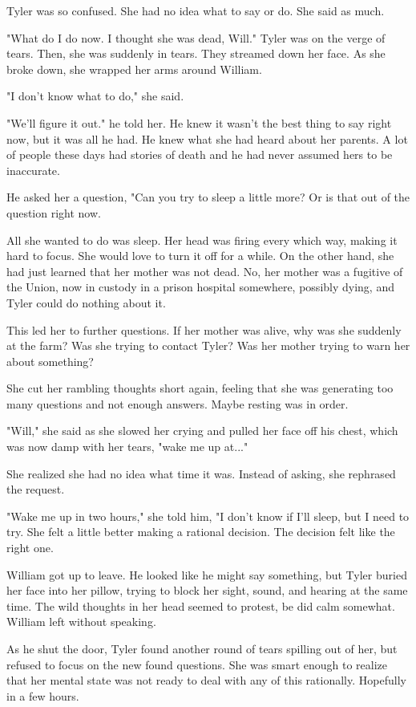 \documentclass[courier]{sffms}
\begin{document}
Tyler was so confused. She had no idea what to
say or do. She said as much.

"What do I do now. I thought she was dead, Will."
Tyler was on the verge of tears. Then, she was
suddenly in tears. They streamed down her face.
As she broke down, she wrapped her arms around
William.

"I don't know what to do," she said.

"We'll figure it out." he told her. He knew it wasn't
the best thing to say right now, but it was all he
had. He knew what she had heard about her
parents. A lot of people these days had stories
of death and he had never assumed hers to be
inaccurate.

He asked her a question, "Can you try to sleep a
little more? Or is that out of the question right
now.

All she wanted to do was sleep. Her head was
firing every which way, making it hard to
focus. She would love to turn it off for a while.
On the other hand, she had just learned that
her mother was not dead. No, her mother was
a fugitive of the Union, now in custody in a
prison hospital somewhere, possibly dying, and
Tyler could do nothing about it.

This led her to further questions. If her mother
was alive, why was she suddenly at the farm?
Was she trying to contact Tyler? Was her mother
trying to warn her about something?

She cut her rambling thoughts short again,
feeling that she was generating too many
questions and not enough answers. Maybe 
resting was in order.

"Will," she said as she slowed her crying and
pulled her face off his chest, which was now
damp with her tears, "wake me up at..."

She realized she had no idea what time it was.
Instead of asking, she rephrased the request.

"Wake me up in two hours," she told him, "I
don't know if I'll sleep, but I need to try.
She felt a little better making a rational decision.
The decision felt like the right one.

William got up to leave. He looked like he might
say something, but Tyler buried her face into her
pillow, trying to block her sight, sound, and hearing
at the same time. The wild thoughts in her
head seemed to protest, be did calm somewhat.
William left without speaking.

As he shut the door, Tyler found another round
of tears spilling out of her, but refused to focus
on the new found questions. She was smart
enough to realize that her mental state was not
ready to deal with any of this rationally. Hopefully
in a few hours.
\end{document}
